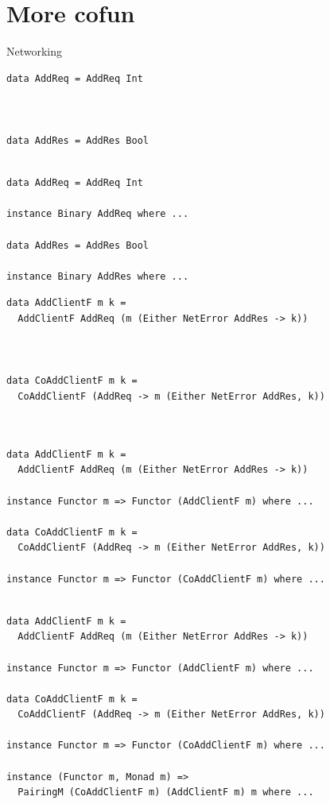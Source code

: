 \documentclass{beamer}
\begin{document}
\section{More cofun}

\begin{frame}[c]
  \centering
  Networking
\end{frame}

\begin{frame}[fragile]
  \begin{overprint}
  \begin{verbatim}
data AddReq = AddReq Int



data AddRes = AddRes Bool


  \end{verbatim}
  \begin{verbatim}
data AddReq = AddReq Int

instance Binary AddReq where ...

data AddRes = AddRes Bool

instance Binary AddRes where ...
  \end{verbatim}
  \end{overprint}
\end{frame}

\begin{frame}[fragile]
  \begin{overprint}
  \begin{verbatim}
data AddClientF m k =
  AddClientF AddReq (m (Either NetError AddRes -> k))



data CoAddClientF m k =
  CoAddClientF (AddReq -> m (Either NetError AddRes, k))



  \end{verbatim}
  \begin{verbatim}
data AddClientF m k =
  AddClientF AddReq (m (Either NetError AddRes -> k))

instance Functor m => Functor (AddClientF m) where ...

data CoAddClientF m k =
  CoAddClientF (AddReq -> m (Either NetError AddRes, k))

instance Functor m => Functor (CoAddClientF m) where ...


  \end{verbatim}
  \begin{verbatim}
data AddClientF m k =
  AddClientF AddReq (m (Either NetError AddRes -> k))

instance Functor m => Functor (AddClientF m) where ...

data CoAddClientF m k =
  CoAddClientF (AddReq -> m (Either NetError AddRes, k))

instance Functor m => Functor (CoAddClientF m) where ...

instance (Functor m, Monad m) =>
  PairingM (CoAddClientF m) (AddClientF m) m where ...
  \end{verbatim}
  \end{overprint}
\end{frame}
\end{document}
